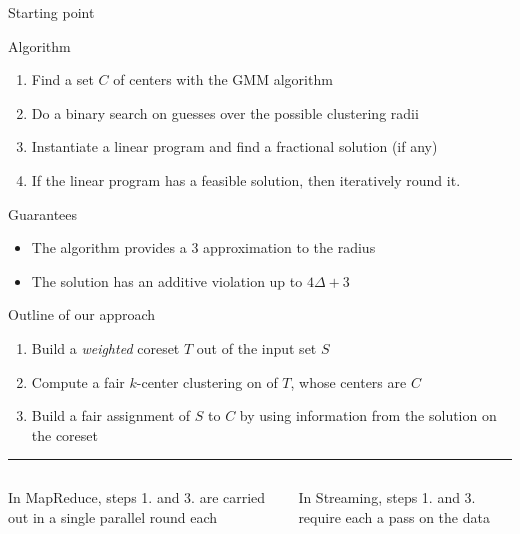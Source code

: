 \documentclass{beamer}
\begin{document}
\begin{frame}{Starting point~\cite{DBLP:conf/nips/BeraCFN19,DBLP:conf/nips/HarbL20}}
	\begin{block}{Algorithm}
		\begin{enumerate}
			\item Find a set $C$ of centers with the GMM algorithm
			\item Do a binary search on guesses over the possible clustering radii
			\item Instantiate a linear program and find a fractional solution (if any)
			\item If the linear program has a feasible solution,
			      then iteratively round it.
		\end{enumerate}
	\end{block}

	\pause

	\begin{block}{Guarantees}
		\begin{itemize}
			\item The algorithm provides a $3$ approximation to the radius
			\item The solution has an additive violation up to $4\Delta+3$
		\end{itemize}
	\end{block}

\end{frame}


\begin{frame}{Outline of our approach}
	\begin{enumerate}
		\item Build a \emph{weighted} coreset $T$ out of the input set $S$
		\item Compute a fair $k$-center clustering on of $T$, whose centers are $C$
		\item Build a fair assignment of $S$ to $C$ by using information from the solution on the coreset
	\end{enumerate}

	\vfill\hrule\vfill
	\pause

	\begin{columns}
		\begin{column}[t]{0.49\textwidth}
			\centering
			In MapReduce, steps 1. and 3. are carried out in a single parallel round each
		\end{column}
		\begin{column}[t]{0.49\textwidth}
			\centering
			In Streaming, steps 1. and 3. require each a pass on the data
		\end{column}
	\end{columns}


\end{frame}
\end{document}
